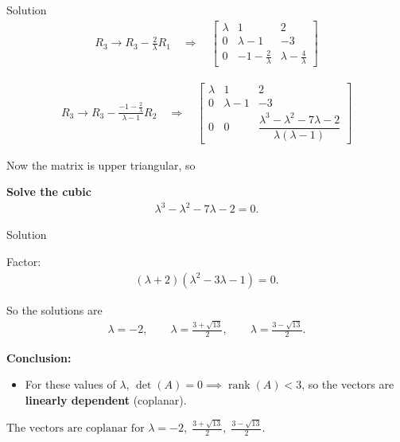 \documentclass{beamer}
\numberwithin{equation}{section}
\theoremstyle{remark}
\begin{document}
\begin{frame}{Solution}
\begin{align}
R_3 \to R_3 - \tfrac{2}{\lambda}R_1 \quad \Rightarrow \quad
\begin{bmatrix}
\lambda & 1 & 2 \\
0 & \lambda-1 & -3 \\
0 & -1-\tfrac{2}{\lambda} & \lambda - \tfrac{4}{\lambda}
\end{bmatrix}
\end{align}

\begin{align}
R_3 \to R_3 - \frac{-1-\tfrac{2}{\lambda}}{\lambda-1}R_2
\quad \Rightarrow \quad
\begin{bmatrix}
\lambda & 1 & 2 \\
0 & \lambda-1 & -3 \\
0 & 0 & \dfrac{\lambda^3-\lambda^2-7\lambda-2}{\lambda(\lambda-1)}
\end{bmatrix}
\end{align}

Now the matrix is upper triangular, so

\bigskip

\textbf{Solve the cubic}  
\begin{align}
\lambda^3 - \lambda^2 - 7\lambda - 2 = 0.
\end{align}
\end{frame}
\begin{frame}{Solution}

Factor:
\begin{align}
(\lambda+2)(\lambda^2 - 3\lambda - 1) = 0.
\end{align}

So the solutions are
\begin{align}
\lambda = -2, \qquad \lambda = \frac{3+\sqrt{13}}{2}, \qquad \lambda = \frac{3-\sqrt{13}}{2}.
\end{align}

\bigskip
\textbf{Conclusion:}  
\begin{itemize}
\item For these values of $\lambda$, $\det(A)=0 \implies \operatorname{rank}(A)<3$, so the vectors are \textbf{linearly dependent} (coplanar).
\end{itemize}

$\boxed{\text{The vectors are coplanar for } \lambda=-2, \; \tfrac{3+\sqrt{13}}{2}, \; \tfrac{3-\sqrt{13}}{2}.}$
\end{frame}
\end{document}

